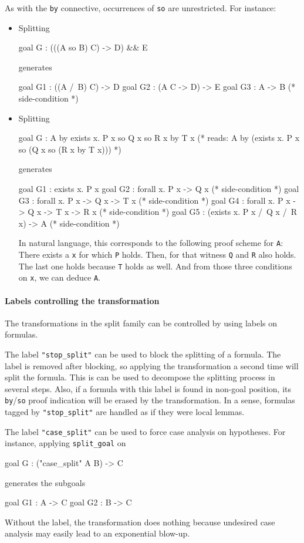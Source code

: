\begin{description}
As with the \texttt{by} connective, occurrences of \texttt{so} are
unrestricted. For instance:
\begin{itemize}
\item Splitting
\begin{whycode}
goal G : (((A so B) \/ C) -> D) && E
\end{whycode}
generates
\begin{whycode}
goal G1 : ((A /\ B) \/ C) -> D
goal G2 : (A \/ C -> D) -> E
goal G3 : A -> B               (* side-condition *)
\end{whycode}
\item Splitting
\begin{whycode}
goal G : A by exists x. P x so Q x so R x by T x
(* reads: A by (exists x. P x so (Q x so (R x by T x))) *)
\end{whycode}
generates
\begin{whycode}
goal G1 : exists x. P x
goal G2 : forall x. P x -> Q x               (* side-condition *)
goal G3 : forall x. P x -> Q x -> T x        (* side-condition *)
goal G4 : forall x. P x -> Q x -> T x -> R x (* side-condition *)
goal G5 : (exists x. P x /\ Q x /\ R x) -> A (* side-condition *)
\end{whycode}
In natural language, this corresponds to the following proof scheme
for \verb|A|: There exists a \verb|x| for which \verb|P| holds. Then,
for that witness \verb|Q| and \verb|R| also holds. The last one holds
because \verb|T| holds as well. And from those three conditions on
\verb|x|, we can deduce \verb|A|.
\end{itemize}

\paragraph{Labels controlling the transformation}

The transformations in the split family can be controlled by using
labels on formulas.

The label \verb|"stop_split"| can be used to block the splitting of a
formula.  The label is removed after blocking, so applying the
transformation a second time will split the formula. This is can be
used to decompose the splitting process in several steps. Also, if a
formula with this label is found in non-goal position, its
\texttt{by}/\texttt{so} proof indication will be erased by the
transformation. In a sense, formulas tagged by \verb|"stop_split"| are
handled as if they were local lemmas.

The label \verb|"case_split"| can be used to force case analysis on hypotheses.
For instance, applying \texttt{split\_goal} on
\begin{whycode}
goal G : ("case_split" A \/ B) -> C
\end{whycode}
generates the subgoals
\begin{whycode}
goal G1 : A -> C
goal G2 : B -> C
\end{whycode}
Without the label, the transformation does nothing because undesired case analysis
may easily lead to an exponential blow-up.


\end{description}
